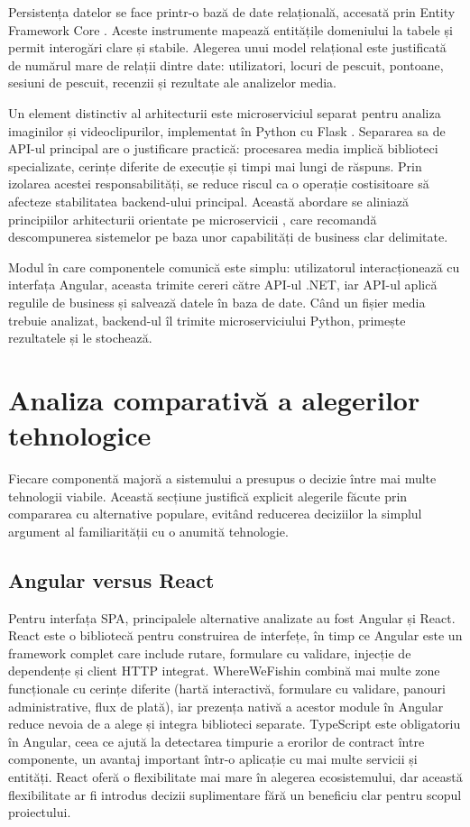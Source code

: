 Persistența datelor se face printr-o bază de date relațională, accesată prin Entity Framework Core \citep{efcore,sqlserver}. Aceste instrumente mapează entitățile domeniului la tabele și permit interogări clare și stabile. Alegerea unui model relațional este justificată de numărul mare de relații dintre date: utilizatori, locuri de pescuit, pontoane, sesiuni de pescuit, recenzii și rezultate ale analizelor media.

Un element distinctiv al arhitecturii este microserviciul separat pentru analiza imaginilor și videoclipurilor, implementat în Python cu Flask \citep{flask}. Separarea sa de API-ul principal are o justificare practică: procesarea media implică biblioteci specializate, cerințe diferite de execuție și timpi mai lungi de răspuns. Prin izolarea acestei responsabilități, se reduce riscul ca o operație costisitoare să afecteze stabilitatea backend-ului principal. Această abordare se aliniază principiilor arhitecturii orientate pe microservicii \citep{newman2015}, care recomandă descompunerea sistemelor pe baza unor capabilități de business clar delimitate.

Modul în care componentele comunică este simplu: utilizatorul interacționează cu interfața Angular, aceasta trimite cereri către API-ul .NET, iar API-ul aplică regulile de business și salvează datele în baza de date. Când un fișier media trebuie analizat, backend-ul îl trimite microserviciului Python, primește rezultatele și le stochează.

\section{Analiza comparativă a alegerilor tehnologice}
\label{sec:alegeri-tehnologice}

Fiecare componentă majoră a sistemului a presupus o decizie între mai multe tehnologii viabile. Această secțiune justifică explicit alegerile făcute prin compararea cu alternative populare, evitând reducerea deciziilor la simplul argument al familiarității cu o anumită tehnologie.

\subsection{Angular versus React}

Pentru interfața SPA, principalele alternative analizate au fost Angular și React. React este o bibliotecă pentru construirea de interfețe, în timp ce Angular este un framework complet care include rutare, formulare cu validare, injecție de dependențe și client HTTP integrat. WhereWeFishin combină mai multe zone funcționale cu cerințe diferite (hartă interactivă, formulare cu validare, panouri administrative, flux de plată), iar prezența nativă a acestor module în Angular reduce nevoia de a alege și integra biblioteci separate. TypeScript \citep{typescript} este obligatoriu în Angular, ceea ce ajută la detectarea timpurie a erorilor de contract între componente, un avantaj important într-o aplicație cu mai multe servicii și entități. React oferă o flexibilitate mai mare în alegerea ecosistemului, dar această flexibilitate ar fi introdus decizii suplimentare fără un beneficiu clar pentru scopul proiectului.

